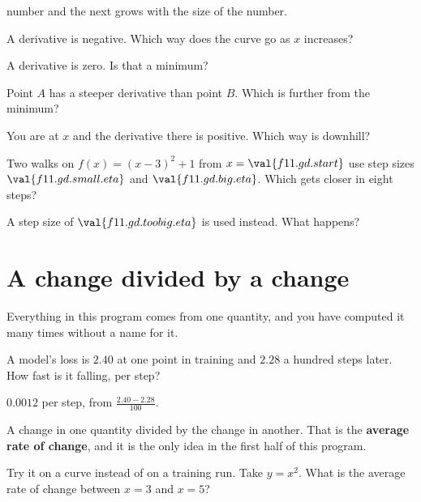\begin{quiz}
{  number and the next grows with the size of the number.}
\item A derivative is negative. Which way does the curve go as $x$ increases?
\item A derivative is zero. Is that a minimum? 
\item Point $A$ has a steeper derivative than point $B$. Which is further from
  the minimum? 
\item You are at $x$ and the derivative there is positive. Which way is
  downhill? 
\item Two walks on $f(x) = (x-3)^{2} + 1$ from $x = \val{f11.gd.start}$ use
  step sizes $\val{f11.gd.small.eta}$ and $\val{f11.gd.big.eta}$. Which gets
  closer in eight steps? 
\item A step size of $\val{f11.gd.toobig.eta}$ is used instead. What happens?
\end{quiz}

\section{A change divided by a change}
\label{sec:F11-average}

\begin{fr}
Everything in this program comes from one quantity, and you have computed it
many times without a name for it.

A model's loss is $\num{2.40}$ at one point in training and $\num{2.28}$ a
hundred steps later. How fast is it falling, per step?
\nextframe
\end{fr}

\begin{fr}
\begin{ansblock}
$\num{0.0012}$ per step, from $\frac{\num{2.40} - \num{2.28}}{100}$.
\end{ansblock}

A change in one quantity divided by the change in another. That is the
\textbf{average rate of change}, and it is the only idea in the first half of
this program.

Try it on a curve instead of on a training run. Take $y = x^{2}$. What is the
average rate of change between $x = 3$ and $x = 5$?
\nextframe
\end{fr}

